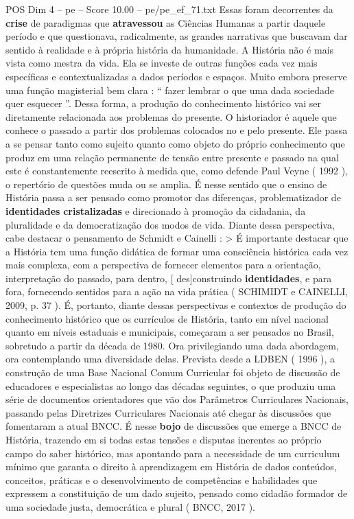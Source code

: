 \begin{textsample}{POS Dim 4 – pe – Score 10.00 – pe/pe\_ef\_71.txt}
Essas foram decorrentes da \textbf{crise} de paradigmas que \textbf{atravessou} as Ciências Humanas a partir daquele período e que questionava, radicalmente, as grandes narrativas que buscavam dar sentido à realidade e à própria história da humanidade.
A História não é mais vista como mestra da vida.
Ela se investe de outras funções cada vez mais específicas e contextualizadas a dados períodos e espaços.
Muito embora preserve uma função magisterial bem clara : “ fazer lembrar o que uma dada sociedade quer esquecer ”.
Dessa forma, a produção do conhecimento histórico vai ser diretamente relacionada aos problemas do presente.
O historiador é aquele que conhece o passado a partir dos problemas colocados no e pelo presente.
Ele passa a se pensar tanto como sujeito quanto como objeto do próprio conhecimento que produz em uma relação permanente de tensão entre presente e passado na qual este é constantemente reescrito à medida que, como defende Paul Veyne ( 1992 ), o repertório de questões muda ou se amplia.
É nesse sentido que o ensino de História passa a ser pensado como promotor das diferenças, problematizador de \textbf{identidades} \textbf{cristalizadas} e direcionado à promoção da cidadania, da pluralidade e da democratização dos modos de vida.
Diante dessa perspectiva, cabe destacar o pensamento de Schmidt e Cainelli : > É importante destacar que a História tem uma função didática de formar uma consciência histórica cada vez mais complexa, com a perspectiva de fornecer elementos para a orientação, interpretação do passado, para dentro, [ des]construindo \textbf{identidades}, e para fora, fornecendo sentidos para a ação na vida prática ( SCHIMIDT e CAINELLI, 2009, p. 37 ).
É, portanto, diante dessas perspectivas e contextos de produção do conhecimento histórico que os currículos de História, tanto em nível nacional quanto em níveis estaduais e municipais, começaram a ser pensados no Brasil, sobretudo a partir da década de 1980.
Ora privilegiando uma dada abordagem, ora contemplando uma diversidade delas.
Prevista desde a LDBEN ( 1996 ), a construção de uma Base Nacional Comum Curricular foi objeto de discussão de educadores e especialistas ao longo das décadas seguintes, o que produziu uma série de documentos orientadores que vão dos Parâmetros Curriculares Nacionais, passando pelas Diretrizes Curriculares Nacionais até chegar às discussões que fomentaram a atual BNCC.
É nesse \textbf{bojo} de discussões que emerge a BNCC de História, trazendo em si todas estas tensões e disputas inerentes ao próprio campo do saber histórico, mas apontando para a necessidade de um curriculum mínimo que garanta o direito à aprendizagem em História de dados conteúdos, conceitos, práticas e o desenvolvimento de competências e habilidades que expressem a constituição de um dado sujeito, pensado como cidadão formador de uma sociedade justa, democrática e plural ( BNCC, 2017 ).

\end{textsample}
